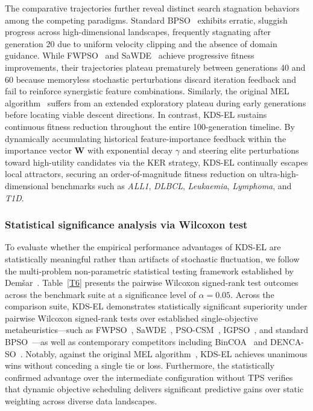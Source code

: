 The comparative trajectories further reveal distinct search stagnation behaviors among the competing paradigms. Standard BPSO~\cite{kennedy1997} exhibits erratic, sluggish progress across high-dimensional landscapes, frequently stagnating after generation 20 due to uniform velocity clipping and the absence of domain guidance. While FWPSO~\cite{wangjia2022} and SaWDE~\cite{wang2022} achieve progressive fitness improvements, their trajectories plateau prematurely between generations 40 and 60 because memoryless stochastic perturbations discard iteration feedback and fail to reinforce synergistic feature combinations. Similarly, the original MEL algorithm~\cite{mel2024} suffers from an extended exploratory plateau during early generations before locating viable descent directions. In contrast, KDS-EL sustains continuous fitness reduction throughout the entire 100-generation timeline. By dynamically accumulating historical feature-importance feedback within the importance vector $\mathbf{W}$ with exponential decay $\gamma$ and steering elite perturbations toward high-utility candidates via the KER strategy, KDS-EL continually escapes local attractors, securing an order-of-magnitude fitness reduction on ultra-high-dimensional benchmarks such as \textit{ALL1}, \textit{DLBCL}, \textit{Leukaemia}, \textit{Lymphoma}, and \textit{T1D}.

\subsubsection{Statistical significance analysis via Wilcoxon test}\label{sec:stats}

To evaluate whether the empirical performance advantages of KDS-EL are statistically meaningful rather than artifacts of stochastic fluctuation, we follow the multi-problem non-parametric statistical testing framework established by Dem{\v{s}}ar~\cite{demsar2006}. Table~\ref{T6} presents the pairwise Wilcoxon signed-rank test outcomes across the benchmark suite at a significance level of $\alpha = 0.05$. Across the comparison suite, KDS-EL demonstrates statistically significant superiority under pairwise Wilcoxon signed-rank tests over established single-objective metaheuristics---such as FWPSO~\cite{wangjia2022}, SaWDE~\cite{wang2022}, PSO-CSM~\cite{wei2025}, IGPSO~\cite{xuezhang2024}, and standard BPSO~\cite{kennedy1997}---as well as contemporary competitors including BinCOA~\cite{shikoun2024} and DENCA-SO~\cite{hancer2023}. Notably, against the original MEL algorithm~\cite{mel2024}, KDS-EL achieves unanimous wins without conceding a single tie or loss. Furthermore, the statistically confirmed advantage over the intermediate configuration without TPS verifies that dynamic objective scheduling delivers significant predictive gains over static weighting across diverse data landscapes.

